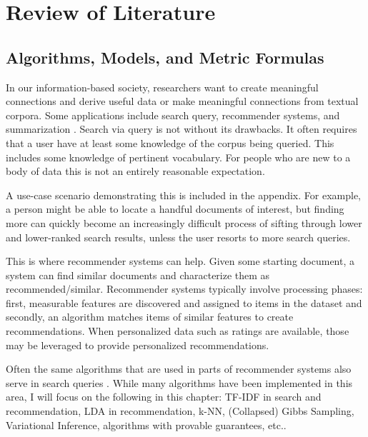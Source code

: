 \chapter{Review of Literature}

\section{Algorithms, Models, and Metric Formulas}

In our information-based society, researchers want to create meaningful connections and derive useful data or make meaningful connections from textual corpora. Some applications include search query, recommender systems, and summarization \citep{Mani01summarizationevaluation:2001}.
Search via query is not without its drawbacks. It often requires that a user have at least some knowledge of the corpus being queried. This includes some knowledge of pertinent vocabulary. For people who are new to a body of data
this is not an entirely reasonable expectation.

A use-case scenario demonstrating this is included in the appendix. For example, a person might be able to locate a handful documents of interest, but finding more can quickly become an increasingly difficult process of sifting through lower and lower-ranked search results, unless the user resorts to more search queries.

This is where recommender systems can help. Given some starting document, a system can find similar documents and characterize them as recommended/similar.
 Recommender systems typically involve processing phases: first, measurable features are discovered and assigned to items in the dataset and secondly, an algorithm matches items of similar features to create recommendations. When personalized data such as ratings are available, those may be leveraged to provide personalized recommendations.

Often the same algorithms that are used in parts of recommender systems also serve in search queries \citep{}. While many algorithms have been implemented in this area, I will focus on the following in this chapter: TF-IDF in search and recommendation, LDA in recommendation, k-NN, (Collapsed) Gibbs Sampling, Variational Inference, algorithms with provable guarantees, etc..

